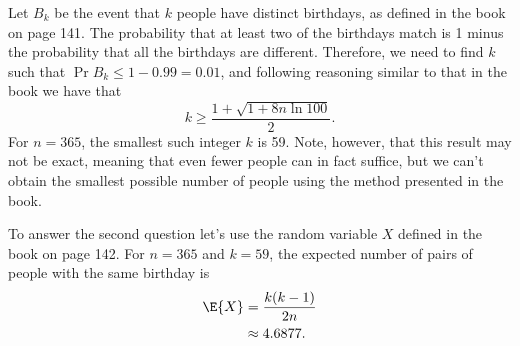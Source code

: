 Let $B_k$ be the event that $k$ people have distinct birthdays, as defined in the book on page 141.
The probability that at least two of the birthdays match is 1 minus the probability that all the birthdays are different.
Therefore, we need to find $k$ such that $\Pr{B_k}\le1-0.99=0.01$, and following reasoning similar to that in the book we have that
\[
    k \ge \frac{1+\sqrt{1+8n\ln100}}{2}.
\]
For $n=365$, the smallest such integer $k$ is 59.
Note, however, that this result may not be exact, meaning that even fewer people can in fact suffice, but we can't obtain the smallest possible number of people using the method presented in the book.

To answer the second question let's use the random variable $X$ defined in the book on page 142.
For $n=365$ and $k=59$, the expected number of pairs of people with the same birthday is
\begin{align*}
    \E{X} &= \frac{k(k-1)}{2n} \\
    &\approx 4.6877.
\end{align*}
